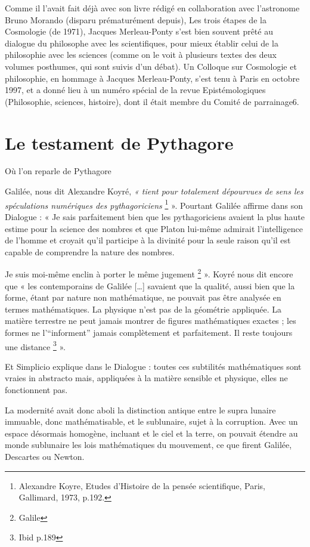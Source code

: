 \documentclass[a4paper,12pt]{article}
\begin{document}
Comme il l'avait fait déjà avec son livre rédigé en collaboration avec
l'astronome Bruno Morando (disparu prématurément depuis), Les trois étapes de la
Cosmologie (de 1971), Jacques Merleau-Ponty s'est bien souvent prêté au dialogue
du philosophe avec les scientifiques, pour mieux établir celui de la philosophie avec
les sciences (comme on le voit à plusieurs textes des deux volumes posthumes, qui
sont suivis d’un débat). Un Colloque sur Cosmologie et philosophie, en hommage
à Jacques Merleau-Ponty, s’est tenu à Paris en octobre 1997, et a donné lieu à un
numéro spécial de la revue Epistémologiques (Philosophie, sciences, histoire), dont
il était membre du Comité de parrainage6.









\section{Le testament de Pythagore}

Où l’on reparle de Pythagore

Galilée, nous dit Alexandre Koyré, \textit{« tient pour totalement dépourvues de sens les spéculations numériques des pythagoriciens} \footnote{Alexandre Koyre, Etudes d’Histoire de la pensée scientifique, Paris, Gallimard, 1973, p.192.} ». Pourtant Galilée affirme dans son Dialogue : « Je sais parfaitement bien que les pythagoriciens avaient la plus haute estime pour la science des nombres et que Platon lui-même admirait l'intelligence de l'homme et croyait qu'il participe à la divinité pour la seule raison qu'il est capable de comprendre la nature des nombres. 

Je suis moi-même enclin à porter le même jugement \footnote{Galile} ». Koyré nous dit encore que « les contemporains de Galilée […] savaient que la qualité, aussi bien que la forme, étant par nature non mathématique, ne pouvait pas être analysée en termes mathématiques. La physique n'est pas de la géométrie appliquée. La matière terrestre ne peut jamais montrer de figures mathématiques exactes ; les formes ne l'“informent” jamais complètement et parfaitement. Il reste toujours une distance \footnote{Ibid p.189} ».

Et Simplicio explique dans le Dialogue : toutes ces subtilités mathématiques sont vraies in abstracto mais, appliquées à la matière sensible et physique, elles ne fonctionnent pas.

La modernité avait donc aboli la distinction antique entre le supra lunaire immuable, donc mathématisable, et le sublunaire, sujet à la corruption. Avec un espace désormais homogène, incluant et le ciel et la terre, on pouvait étendre au monde sublunaire les lois mathématiques du mouvement, ce que firent Galilée, Descartes ou Newton.
\end{document}
